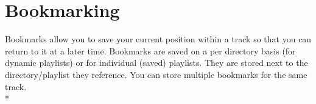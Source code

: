 \section{\label{ref:Bookmarkconfigactual}Bookmarking}
  Bookmarks allow you to save your current position within a track so that 
  you can return to it at a later time. Bookmarks are saved on a per directory
  basis (for dynamic playlists) or for individual (saved) playlists. They are 
  stored next to the directory/playlist they reference.
  You can store multiple bookmarks for the same track.\\*
  

